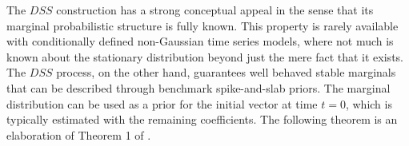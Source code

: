 \documentclass[ba]{imsart}
\numberwithin{equation}{section}
\theoremstyle{plain}
\begin{document}
The $DSS$ construction has a strong conceptual appeal  in the sense that its marginal probabilistic structure is fully known. This property is  rarely available with conditionally defined non-Gaussian time series models, where not much is known about the stationary distribution  beyond just the mere fact that it exists. The $DSS$ process, on the other hand, guarantees well behaved stable marginals that can be described through benchmark spike-and-slab priors. The marginal distribution can be used as a prior for the initial vector at time $t=0$, which is typically estimated with the remaining coefficients.  %
The following theorem  is an elaboration of  Theorem 1 of \cite{kalli}.
\end{document}

